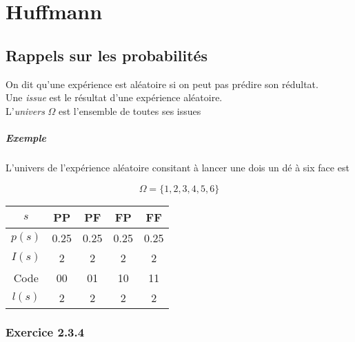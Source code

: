 \chapter{Huffmann}

\section{Rappels sur les probabilités}
On dit qu'une expérience est aléatoire si on peut pas prédire son rédultat. \\
Une \emph{issue} est le résultat d'une expérience aléatoire. \\
L'\emph{univers} $\Omega$ est l'ensemble de toutes ses issues

\paragraph{Exemple}
L'univers de l'expérience aléatoire consitant à lancer une dois un dé à six face est

\[
  \Omega = \{ 1, 2, 3, 4, 5, 6 \}
\]

\begin{tabular}{| c || c c c c |}
  \hline
  $s$    & PP   & PF   & FP   & FF   \\
  \hline
  $p(s)$ & 0.25 & 0.25 & 0.25 & 0.25 \\
  \hline
  $I(s)$ & 2    & 2    & 2    & 2    \\
  \hline
  Code   & 00   & 01   & 10   & 11   \\
  \hline
  $l(s)$ & 2    & 2    & 2    & 2    \\
  \hline
\end{tabular}

\subsection{Exercice 2.3.4}

